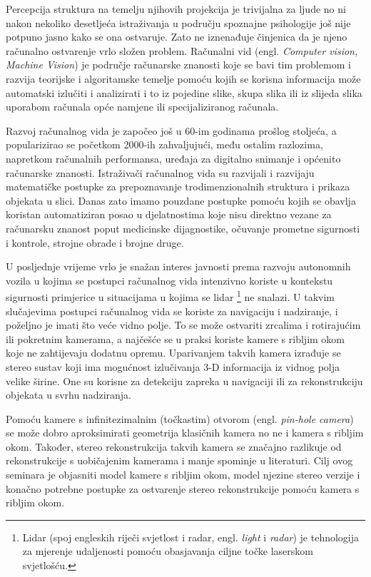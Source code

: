 \documentclass[../seminar.tex]{subfiles}
\begin{document}
Percepcija struktura na temelju njihovih projekcija je trivijalna za ljude no ni nakon nekoliko desetljeća istraživanja u području spoznajne psihologije još nije potpuno jasno kako se ona ostvaruje.
Zato ne iznenađuje činjenica da je njeno računalno ostvarenje vrlo složen problem. Računalni vid (engl. \textit{Computer vision, Machine Vision}) je područje računarske
znanosti koje se bavi tim problemom i razvija teorijske i algoritamske temelje pomoću kojih se korisna informacija može automatski izlučiti i analizirati i to iz pojedine slike, skupa slika ili iz slijeda slika uporabom računala opće namjene ili specijaliziranog računala. \cite{Ribaric01}

Razvoj računalnog vida je započeo još u 60-im godinama prošlog stoljeća, a popularizirao se početkom 2000-ih zahvaljujući, među ostalim razlozima, napretkom računalnih performansa, uređaja za digitalno snimanje i općenito računarske znanosti. Istraživači računalnog vida su razvijali i razvijaju matematičke postupke za prepoznavanje trodimenzionalnih struktura i prikaza objekata u slici. Danas zato imamo pouzdane postupke pomoću kojih se obavlja koristan automatiziran posao u djelatnostima koje nisu direktno vezane za računarsku znanost poput medicinske dijagnostike, očuvanje prometne sigurnosti i kontrole, strojne obrade i brojne druge. \cite{SzeliskiIntro}

U posljednje vrijeme vrlo je snažan interes javnosti prema razvoju autonomnih vozila u kojima se postupci računalnog vida intenzivno koriste u kontekstu sigurnosti primjerice u situacijama u kojima se lidar \footnote{Lidar (spoj engleskih riječi svjetlost i radar, engl. \textit{light} i \textit{radar}) je tehnologija za mjerenje udaljenosti pomoću obasjavanja ciljne točke laserskom svjetlošću.} ne snalazi. U takvim slučajevima postupci računalnog vida se koriste za navigaciju i nadziranje, i poželjno je imati što veće vidno polje.
To se može ostvariti zrcalima i rotirajućim ili pokretnim kamerama, a najčešće se u praksi koriste kamere s ribljim okom koje ne zahtijevaju dodatnu opremu. Uparivanjem takvih kamera izrađuje se stereo sustav koji ima mogućnost izlučivanja 3-D informacija iz vidnog polja velike širine. One su korisne za detekciju zapreka u navigaciji ili za rekonstrukciju objekata u svrhu nadziranja. \cite{Abraham}

Pomoću kamere s infinitezimalnim (točkastim) otvorom (engl. \textit{pin-hole camera}) se može dobro aproksimirati geometrija klasičnih kamera no ne i kamera s ribljim okom. Također, stereo rekonstrukcija takvih kamera se značajno razlikuje od rekonstrukcije s uobičajenim kamerama i manje spominje u literaturi. Cilj ovog seminara je objasniti model kamere s ribljim okom, model njezine stereo verzije i konačno potrebne postupke za ostvarenje stereo rekonstrukcije pomoću kamera s ribljim okom.
\end{document}
